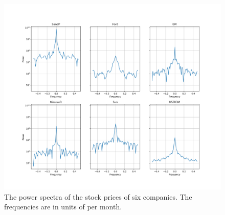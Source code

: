 \documentclass[11pt, letterpage]{article}
\begin{document}
\begin{figure}
  \includegraphics[width=\pagewidth]{stocks_power_spectrum.png}
  \caption{
    The power spectra of the stock prices of six companies. The frequencies are
    in units of per month.
  }
  \label{fig:stocks_ps}
\end{figure}
\end{document}
